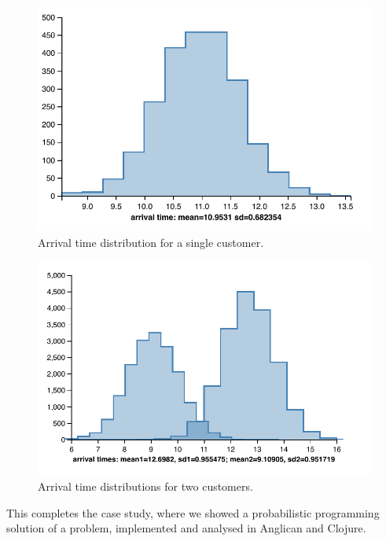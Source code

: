 \documentclass[sigconf]{acmart}
\begin{document}
\begin{figure}
    \centering
    \includegraphics[trim={0pt 12pt 0 12pt},scale=0.6]{same-customer-time.pdf}
    \caption{Arrival time distribution for a single customer.}
    \label{fig:dist-same}
\end{figure}

\begin{figure}
    \centering
    \includegraphics[trim={0pt 12pt 0 12pt},clip,scale=0.6]{different-customers-times.pdf}
    \caption{Arrival time distributions for two customers.}
    \label{fig:dist-diff}
\end{figure}

\iftoggle{full}{%

}{}%

This completes the case study, where we showed a probabilistic
programming solution of a problem, implemented and analysed in
Anglican and Clojure\iftoggle{full}{, using two different
inference algorithms}{}.
\end{document}

